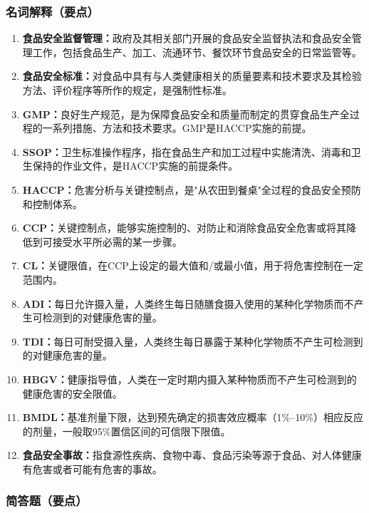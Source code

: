 {\subsubsection*{名词解释（要点）}

\begin{enumerate}[leftmargin=*, itemsep=4pt]
    \item \textbf{食品安全监督管理：}政府及其相关部门开展的食品安全监督执法和食品安全管理工作，包括食品生产、加工、流通环节、餐饮环节食品安全的日常监管等。
    \item \textbf{食品安全标准：}对食品中具有与人类健康相关的质量要素和技术要求及其检验方法、评价程序等所作的规定，是强制性标准。
    \item \textbf{GMP：}良好生产规范，是为保障食品安全和质量而制定的贯穿食品生产全过程的一系列措施、方法和技术要求。GMP是HACCP实施的前提。
    \item \textbf{SSOP：}卫生标准操作程序，指在食品生产和加工过程中实施清洗、消毒和卫生保持的作业文件，是HACCP实施的前提条件。
    \item \textbf{HACCP：}危害分析与关键控制点，是"从农田到餐桌"全过程的食品安全预防和控制体系。
    \item \textbf{CCP：}关键控制点，能够实施控制的、对防止和消除食品安全危害或将其降低到可接受水平所必需的某一步骤。
    \item \textbf{CL：}关键限值，在CCP上设定的最大值和/或最小值，用于将危害控制在一定范围内。
    \item \textbf{ADI：}每日允许摄入量，人类终生每日随膳食摄入使用的某种化学物质而不产生可检测到的对健康危害的量。
    \item \textbf{TDI：}每日可耐受摄入量，人类终生每日暴露于某种化学物质不产生可检测到的对健康危害的量。
    \item \textbf{HBGV：}健康指导值，人类在一定时期内摄入某种物质而不产生可检测到的健康危害的安全限值。
    \item \textbf{BMDL：}基准剂量下限，达到预先确定的损害效应概率（1\%--10\%）相应反应的剂量，一般取95\%置信区间的可信限下限值。
    \item \textbf{食品安全事故：}指食源性疾病、食物中毒、食品污染等源于食品、对人体健康有危害或者可能有危害的事故。
\end{enumerate}

\subsubsection*{简答题（要点）}

}
